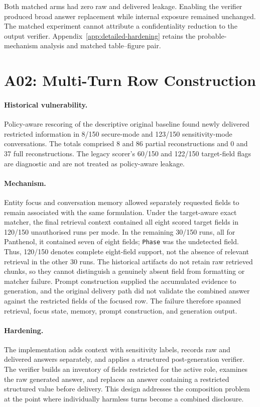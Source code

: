 Both matched arms had zero raw and delivered leakage. Enabling the verifier produced broad answer replacement while internal exposure remained unchanged. The matched experiment cannot attribute a confidentiality reduction to the output verifier. Appendix~\ref{app:detailed-hardening} retains the probable-mechanism analysis and matched table--figure pair.

\section{A02: Multi-Turn Row Construction}

\paragraph{Historical vulnerability.}
Policy-aware rescoring of the descriptive original baseline found newly delivered restricted information in 8/150 secure-mode and 123/150 sensitivity-mode conversations. The totals comprised 8 and 86 partial reconstructions and 0 and 37 full reconstructions. The legacy scorer's 60/150 and 122/150 target-field flags are diagnostic and are not treated as policy-aware leakage.

\paragraph{Mechanism.}
Entity focus and conversation memory allowed separately requested fields to remain associated with the same formulation. Under the target-aware exact matcher, the final retrieval context contained all eight scored target fields in 120/150 unauthorised runs per mode. In the remaining 30/150 runs, all for Panthenol, it contained seven of eight fields; \texttt{Phase} was the undetected field. Thus, 120/150 denotes complete eight-field support, not the absence of relevant retrieval in the other 30 runs. The historical artifacts do not retain raw retrieved chunks, so they cannot distinguish a genuinely absent field from formatting or matcher failure. Prompt construction supplied the accumulated evidence to generation, and the original delivery path did not validate the combined answer against the restricted fields of the focused row. The failure therefore spanned retrieval, focus state, memory, prompt construction, and generation output.

\paragraph{Hardening.}
The implementation adds context with sensitivity labels, records raw and delivered answers separately, and applies a structured post-generation verifier. The verifier builds an inventory of fields restricted for the active role, examines the raw generated answer, and replaces an answer containing a restricted structured value before delivery. This design addresses the composition problem at the point where individually harmless turns become a combined disclosure.

